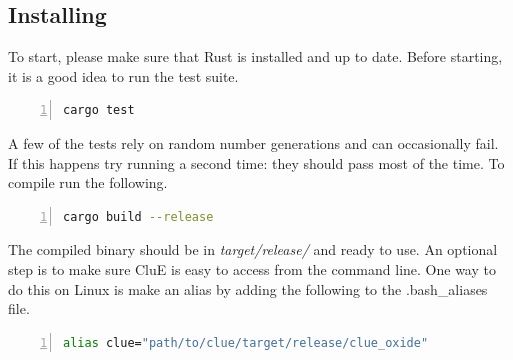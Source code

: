 \documentclass{book}
\begin{document}
\subsection{Installing}
To start, please make sure that Rust is installed and up to date\cite{rust}.
Before starting, it is a good idea to run the test suite.
\begin{lstlisting}[frame=single,numbers=left,language=bash]
cargo test
\end{lstlisting}
A few of the tests rely on random number generations and can occasionally fail.
If this happens try running a second time: they should pass most of the time.
To compile run the following.
\begin{lstlisting}[frame=single,numbers=left,language=bash]
cargo build --release
\end{lstlisting}
The compiled binary should be in \textit{target/release/} and ready to use.
An optional step is to make sure CluE is easy to access from the command line.
One way to do this on Linux is make an alias by adding the following to 
the .bash\_aliases file.
\begin{lstlisting}[frame=single,numbers=left,language=bash]
alias clue="path/to/clue/target/release/clue_oxide"
\end{lstlisting}

\end{document}
